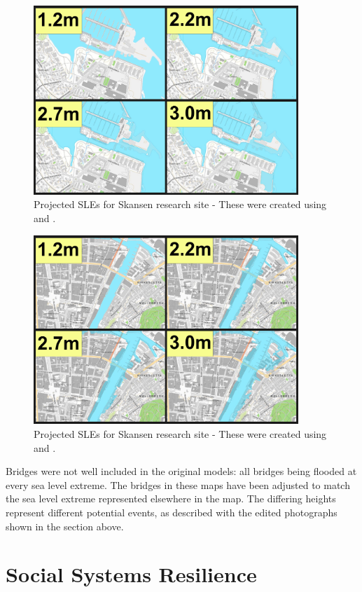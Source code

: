 \begin{figure}[H]
    \centering
    \includegraphics[width=10cm]{fig_sle/grillstad-sle-num.png}
    \caption{Projected SLEs for Skansen research site - These were created using \cite{kartverket_se_2021} and \cite{stormflo_database_stormflo_2021}. }
    \label{fig:sle-grillstad-num}
\end{figure}

\begin{figure}[H]
    \centering
    \includegraphics[width=10cm]{fig_sle/nidelva-sle-num.png}
    \caption{Projected SLEs for Skansen research site - These were created using \cite{kartverket_se_2021} and \cite{stormflo_database_stormflo_2021}. }
    \label{fig:sle-nidelva-num}
\end{figure}

 Bridges were not well included in the original models: all bridges being flooded at every sea level extreme. The bridges in these maps have been adjusted to match the sea level extreme represented elsewhere in the map. The differing heights represent different potential events,  as described with the edited photographs shown in the section above. 

\section{Social Systems Resilience}

